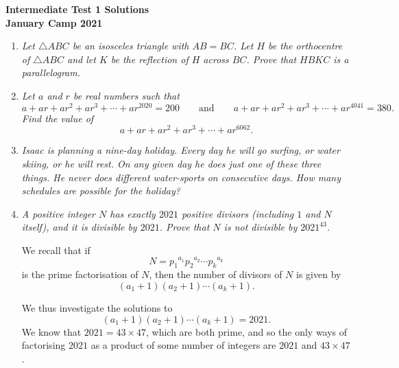 \documentclass{article}
\begin{document}
\thispagestyle{empty}

\begin{center}
  \textbf{\Large Intermediate Test 1 Solutions}
  \\ \vspace{1em}
  \textbf{\large January Camp 2021}
\end{center}

\vspace{24pt}

\begin{enumerate}[1.]

  \item %
  {\itshape Let $\triangle ABC$ be an isosceles triangle with $AB = BC$. Let $H$ be the orthocentre of $\triangle ABC$ and let $K$ be the reflection of $H$ across $BC$. Prove that $HBKC$ is a parallelogram.}
  
  
  \item %
  {\itshape Let $a$ and $r$ be real numbers such that
  \[ a +ar +ar^2 +ar^3 +\dotsb +ar^{2020} = 200 \qquad\text{and}\qquad a +ar +ar^2 +ar^3 +\dotsb +ar^{4041} = 380. \]
  Find the value of
  \[ a +ar +ar^2 +ar^3 +\dotsb +ar^{6062}. \]}
  
  
  \item %
  {\itshape Isaac is planning a nine-day holiday. Every day he will go surfing, or water skiing, or he will rest. On any given day he does just one of these three things. He never does different water-sports on consecutive days. How many schedules are possible for the holiday?}
  
  
  \item %
  {\itshape A positive integer $N$ has exactly $2021$ positive divisors (including $1$ and $N$ itself), and it is divisible by $2021$.
  Prove that $N$ is not divisible by $2021^{43}$.}

  We recall that if
  \[
    N = {p_1}^{a_1} {p_2}^{a_2} \cdots {p_k}^{a_k}
  \]
  is the prime factorisation of $N$, then the number of divisors of $N$ is given by
  \[
    (a_1 + 1)(a_2 + 1) \cdots (a_k + 1).
  \]

  We thus investigate the solutions to
  \[
    (a_1 + 1)(a_2 + 1) \cdots (a_k + 1) = 2021.
  \]
  We know that $2021 = 43 \times 47$, which are both prime, and so the only ways of factorising $2021$ as a product of some number of integers are $2021$ and $43 \times 47$.


\end{enumerate}
\end{document}
